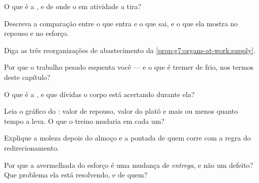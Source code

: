 \begin{exercise}[$\star$]\label{exo:g7:organs-at-work:2}
O que é a , e de onde o  em atividade a tira?
\end{exercise}

\begin{exercise}[$\star$]\label{exo:g7:organs-at-work:3}
Descreva a comparação entre o  que entra e o que sai, e o que
ela mostra no repouso e no esforço.
\end{exercise}

\begin{exercise}[$\star$]\label{exo:g7:organs-at-work:4}
Diga as três reorganizações de abastecimento da
\cref{prop:g7:organs-at-work:supply}.
\end{exercise}

\begin{exercise}[$\star$]\label{exo:g7:organs-at-work:5}
Por que o trabalho pesado esquenta você --- e o que é tremer de frio,
nos termos deste capítulo?
\end{exercise}

\begin{exercise}[$\star$]\label{exo:g7:organs-at-work:6}
O que é a , e que dívidas o corpo está acertando durante
ela?
\end{exercise}

\begin{exercise}[$\star\star$]\label{exo:g7:organs-at-work:7}
Leia o gráfico do : valor de repouso, valor do platô e mais ou
menos quanto tempo a  leva. O que o treino mudaria em cada
um?
\end{exercise}

\begin{exercise}[$\star\star$]\label{exo:g7:organs-at-work:8}
Explique a moleza depois do almoço e a pontada de quem corre com a
regra do redirecionamento.
\end{exercise}

\begin{exercise}[$\star\star$]\label{exo:g7:organs-at-work:9}
Por que a  avermelhada do esforço é uma mudança de
\emph{entrega}, e não um defeito? Que problema ela está resolvendo, e
de quem?
\end{exercise}

